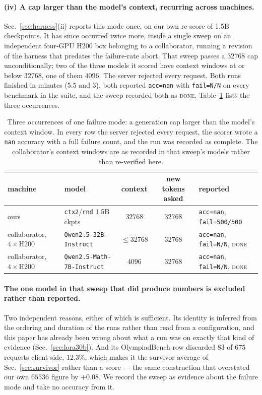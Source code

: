 \paragraph{(iv) A cap larger than the model's context, recurring across machines.}
Sec.~\ref{sec:harness}(ii) reports this mode once, on our own re-score of 1.5B checkpoints.
It has since occurred twice more, inside a single sweep on an independent four-GPU H200 box
belonging to a collaborator, running a revision of the harness that predates the
failure-rate abort. That sweep passes a $32768$ cap unconditionally; two of the three models
it scored have context windows at or below $32768$, one of them $4096$. The server rejected
every request. Both runs finished in minutes ($5.5$ and $3$), both reported \texttt{acc=nan}
with \texttt{fail=N/N} on every benchmark in the suite, and the sweep recorded both as
\textsc{done}. Table~\ref{tab:capcontext} lists the three occurrences.

\begin{table}[t]
\centering\small
\caption{Three occurrences of one failure mode: a generation cap larger than the model's
context window. In every row the server rejected every request, the scorer wrote a
\texttt{nan} accuracy with a full failure count, and the run was recorded as complete. The
collaborator's context windows are as recorded in that sweep's models rather than
re-verified here.}
\label{tab:capcontext}
\begin{tabular}{llccl}
\toprule
machine & model & context & new tokens asked & reported \\
\midrule
ours                        & \texttt{ctx2}/\texttt{rnd} 1.5B ckpts & $32768$      & $32768$ & \texttt{acc=nan}, \texttt{fail=500/500} \\
collaborator, $4\times$H200 & \texttt{Qwen2.5-32B-Instruct}         & $\le 32768$  & $32768$ & \texttt{acc=nan}, \texttt{fail=N/N}, \textsc{done} \\
collaborator, $4\times$H200 & \texttt{Qwen2.5-Math-7B-Instruct}     & $4096$       & $32768$ & \texttt{acc=nan}, \texttt{fail=N/N}, \textsc{done} \\
\bottomrule
\end{tabular}
\end{table}

\paragraph{The one model in that sweep that did produce numbers is excluded rather than
reported.} Two independent reasons, either of which is sufficient. Its identity is inferred
from the ordering and duration of the runs rather than read from a configuration, and this
paper has already been wrong about what a run was on exactly that kind of evidence
(Sec.~\ref{sec:lora30b}). And its OlympiadBench row discarded $83$ of $675$ requests
client-side, $12.3\%$, which makes it the survivor average of Sec.~\ref{sec:survivor} rather
than a score --- the same construction that overstated our own $65536$ figure by $+0.08$.
We record the sweep as evidence about the failure mode and take no accuracy from it.

